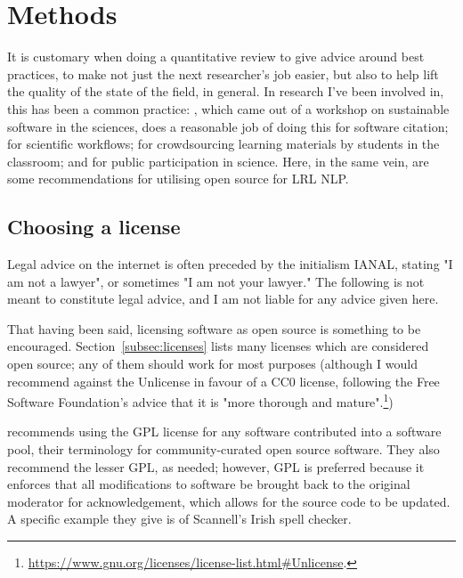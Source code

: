 \section{Methods}
\label{sec:methods}

It is customary when doing a quantitative review to give advice around best practices, to make not just the next researcher's job easier, but also to help lift the quality of the state of the field, in general. In research I've been involved in, this has been a common practice: \citet{DBLP:journals/corr/KatzCWHVHSJCCVL15}, which came out of a workshop on sustainable software in the sciences, does a reasonable job of doing this for software citation; \citet{LittIDCC} for scientific workflows; \citet{LittEdulearn} for crowdsourcing learning materials by students in the classroom; and \citet{wiggins2013data} for public participation in science. Here, in the same vein, are some recommendations for utilising open source for LRL NLP.

\subsection{Choosing a license}
\label{choosing-a-license}

Legal advice on the internet is often preceded by the initialism IANAL, stating "I am not a lawyer", or sometimes "I am not your lawyer." The following is not meant to constitute legal advice, and I am not liable for any advice given here.

That having been said, licensing software as open source is something to be encouraged. Section~\ref{subsec:licenses} lists many licenses which are considered open source; any of them should work for most purposes (although I would recommend against the Unlicense in favour of a CC0 license, following the Free Software Foundation's advice that it is "more thorough and mature".\footnote{\href{https://www.gnu.org/licenses/license-list.html\#Unlicense}{https://www.gnu.org/licenses/license-list.html\#Unlicense}. })

\citet{streiter2006implementing} recommends using the GPL license for any software contributed into a software pool, their terminology for community-curated open source software. They also recommend the lesser GPL, as needed; however, GPL is preferred because it enforces that all modifications to software be brought back to the original moderator for acknowledgement, which allows for the source code to be updated. A specific example they give is of Scannell's Irish spell checker.


